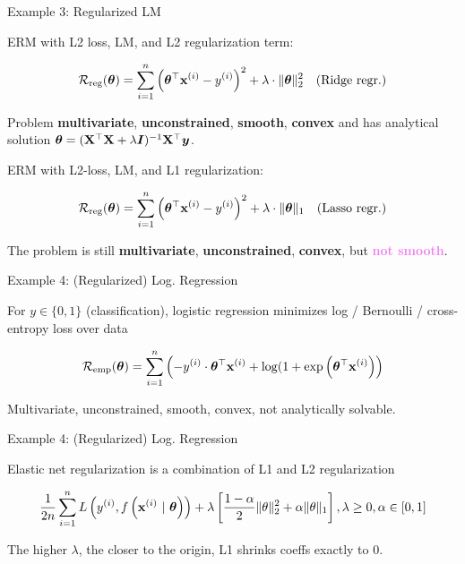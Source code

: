 \documentclass[11pt,compress,t,notes=noshow, xcolor=table]{beamer}
\begin{document}
\begin{framei}[fs=footnotesize]{Example 3: Regularized LM}
\item ERM with L2 loss, LM, and L2 regularization term:
\item[] $$ \mathcal{R}_{\text{reg}}(\bm{\theta}) = \sum\limits_{i=1}^n \left(\bm{\theta}^\top \mathbf{x}^{(i)} - y^{(i)}\right)^2  + \lambda \cdot \|\bm{\theta}\|_2^2 \quad \text{(Ridge regr.)} $$
\item Problem \textbf{multivariate}, \textbf{unconstrained}, \textbf{smooth}, \textbf{convex} and has analytical solution $\bm{\theta} = (\mathbf{X}^\top \mathbf{X} + \lambda \bm{I})^{-1}\mathbf{X}^\top \bm{y}$.
\item ERM with L2-loss, LM, and L1 regularization:
\item[] $$ \mathcal{R}_{\text{reg}}(\bm{\theta}) = \sum\limits_{i=1}^n \left(\bm{\theta}^\top \mathbf{x}^{(i)} - y^{(i)}\right)^2  + \lambda \cdot \|\bm{\theta}\|_1 \quad \text{(Lasso regr.)} $$
\item The problem is still \textbf{multivariate}, \textbf{unconstrained}, \textbf{convex}, but \textcolor{violet}{\textbf{not smooth}}.
\vfill
{}
\end{framei}

\begin{framei}{Example 4: (Regularized) Log. Regression}
\item For $y \in \{0, 1\}$ (classification), logistic regression minimizes log / Bernoulli / cross-entropy loss over data
\item[] $$ \mathcal{R}_{\text{emp}}(\bm{\theta}) = \sum\limits_{i=1}^n \left(-y^{(i)} \cdot \bm{\theta}^\top\mathbf{x}^{(i)} + \log(1 + \exp\left(\bm{\theta}^\top\mathbf{x}^{(i)}\right)\right) $$
\item Multivariate, unconstrained, smooth, convex, not analytically solvable.
\vfill
{}
\end{framei}

\begin{framei}[fs=footnotesize]{Example 4: (Regularized) Log. Regression}
\item Elastic net regularization is a combination of L1 and L2 regularization
\item[] $$ \frac{1}{2n} \sum\limits_{i=1}^n L\left(y^{(i)}, f\left(\mathbf{x}^{(i)} ~|~ \bm{\theta}\right)\right) + \lambda \left[\frac{1-\alpha}{2}\|\theta\|^{2}_{2} + \alpha\|\theta\|_{1}\right], \lambda \geq 0, \alpha \in [0,1] $$
\vfill
\splitVThree
{
\par
{}
}
{
\par
{}
}
{
\par
{}
}
\item The higher $\lambda$, the closer to the origin, L1 shrinks coeffs exactly to 0.
\end{framei}
\end{document}
